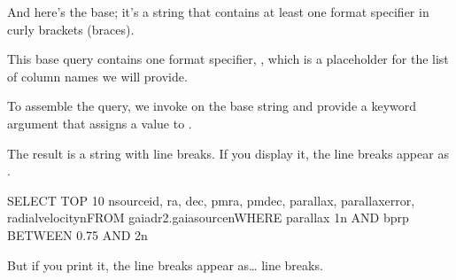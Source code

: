 \documentclass[letterpaper,10pt,english]{sphinxmanual}
\begin{document}
And here’s the base; it’s a string that contains at least one format specifier in curly brackets (braces).

\begin{sphinxVerbatim}[commandchars=\\\{\}]
  
\end{sphinxVerbatim}

This base query contains one format specifier, , which is a placeholder for the list of column names we will provide.

To assemble the query, we invoke  on the base string and provide a keyword argument that assigns a value to .

\begin{sphinxVerbatim}[commandchars=\\\{\}]
  
\end{sphinxVerbatim}

The result is a string with line breaks.  If you display it, the line breaks appear as .

\begin{sphinxVerbatim}[commandchars=\\\{\}]
\end{sphinxVerbatim}

\begin{sphinxVerbatim}[commandchars=\\\{\}]
\PYGZsq{}SELECT TOP 10 \PYGZbs{}nsource\PYGZus{}id, ra, dec, pmra, pmdec, parallax, parallax\PYGZus{}error, radial\PYGZus{}velocity\PYGZbs{}nFROM gaiadr2.gaia\PYGZus{}source\PYGZbs{}nWHERE parallax \PYGZlt{} 1\PYGZbs{}n  AND bp\PYGZus{}rp BETWEEN \PYGZhy{}0.75 AND 2\PYGZbs{}n\PYGZsq{}
\end{sphinxVerbatim}

But if you print it, the line breaks appear as… line breaks.

\begin{sphinxVerbatim}[commandchars=\\\{\}]
\end{sphinxVerbatim}
\end{document}
